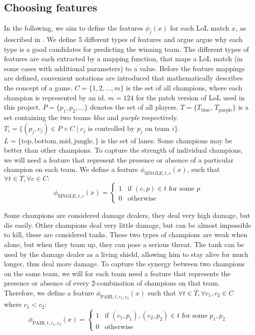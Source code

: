 \subsection{Choosing features}\label{sec:choosingfeatures}
In the following, we aim to define the features $\phi_j(x)$ for each LoL match $x$, as described in .
We define 5 different types of features and argue argue why each type is a good candidates for predicting the winning team.
The different types of features are each extracted by a mapping function, that maps a LoL match (in some cases with additional parameters) to a value. 
Before the feature mappings are defined, convenient notations are introduced that mathematically describes the concept of a game.
$C = \{1, 2, \dots, m\}$ is the set of all champions, where each champion is represented by an id. $m = 124$ for the patch version of LoL used in this project.
$P = \{p_1, p_2, \dots\}$ denotes the set of all players.
$T = \{T_\text{blue}$, $T_\text{purple}\}$ is a set containing the two teams \emph{blue} and \emph{purple} respectively.
$T_i = \{ (p_j, c_j) \in P \times C \mid c_j \text{ is controlled by } p_j \text{ on team } i \}$.
$L = \{\text{top},\text{bottom},\text{mid},\text{jungle},\}$ is the set of lanes.
Some champions may be better than other champions. To capture the strength of individual champions, we will need a feature that represent the presence or absence of a particular champion on each team.
We define a feature $\phi_{\text{SINGLE}, t, c}(x)$, such that $\forall t \in T, \forall c \in C:$
\[
\phi_{\text{SINGLE}, t, c}(x) = 
\begin{cases} 
  1 & \text{if } (c, p) \in t \text{ for some } p \\
  0 & \text{otherwise} 
\end{cases}
\]

Some champions are considered damage dealers, they deal very high damage, but die easily. Other champions deal very little damage, but can be almost impossible to kill, these are considered tanks. These two types of champions are weak when alone, but when they team up, they can pose a serious threat. The tank can be used by the damage dealer as a living shield, allowing him to stay alive for much longer, thus deal more damage.
To capture the synergy between two champions on the same team, we will for each team need a feature that represents the presence or absence of every 2-combination of champions on that team. Therefore, we define a feature $\phi_{\text{PAIR},t, c_1, c_2}(x)$ such that $\forall t \in T, \forall c_1, c_2 \in C$ where $c_1 < c_2$:
\[
\phi_{\text{PAIR}, t, c_1, c_2}(x) =
\begin{cases}
  1 & \text{if } (c_1, p_1), (c_2, p_2) \in t \text{ for some }p_1, p_2\\
  0 & \text{otherwise}
\end{cases}
\]

